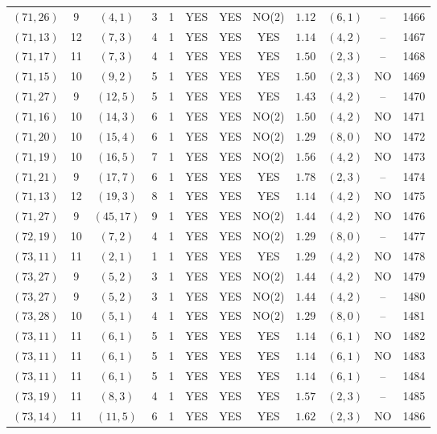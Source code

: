 \begin{longtable}{|c|c|c|c|c|c|c|c|c|c|c|c|}
$(71,26)$ & 9 & $(4,1)$ & 3 & 1 & YES & YES & NO(2) & $1.12$ & $(6,1)$ & -- & 1466\\
$(71,13)$ & 12 & $(7,3)$ & 4 & 1 & YES & YES & YES & $1.14$ & $(4,2)$ & -- & 1467\\
$(71,17)$ & 11 & $(7,3)$ & 4 & 1 & YES & YES & YES & $1.50$ & $(2,3)$ & -- & 1468\\
$(71,15)$ & 10 & $(9,2)$ & 5 & 1 & YES & YES & YES & $1.50$ & $(2,3)$ & NO & 1469\\
$(71,27)$ & 9 & $(12,5)$ & 5 & 1 & YES & YES & YES & $1.43$ & $(4,2)$ & -- & 1470\\
$(71,16)$ & 10 & $(14,3)$ & 6 & 1 & YES & YES & NO(2) & $1.50$ & $(4,2)$ & NO & 1471\\
$(71,20)$ & 10 & $(15,4)$ & 6 & 1 & YES & YES & NO(2) & $1.29$ & $(8,0)$ & NO & 1472\\
$(71,19)$ & 10 & $(16,5)$ & 7 & 1 & YES & YES & NO(2) & $1.56$ & $(4,2)$ & NO & 1473\\
$(71,21)$ & 9 & $(17,7)$ & 6 & 1 & YES & YES & YES & $1.78$ & $(2,3)$ & -- & 1474\\
$(71,13)$ & 12 & $(19,3)$ & 8 & 1 & YES & YES & YES & $1.14$ & $(4,2)$ & NO & 1475\\
$(71,27)$ & 9 & $(45,17)$ & 9 & 1 & YES & YES & NO(2) & $1.44$ & $(4,2)$ & NO & 1476\\
$(72,19)$ & 10 & $(7,2)$ & 4 & 1 & YES & YES & NO(2) & $1.29$ & $(8,0)$ & -- & 1477\\
$(73,11)$ & 11 & $(2,1)$ & 1 & 1 & YES & YES & YES & $1.29$ & $(4,2)$ & NO & 1478\\
$(73,27)$ & 9 & $(5,2)$ & 3 & 1 & YES & YES & NO(2) & $1.44$ & $(4,2)$ & NO & 1479\\
$(73,27)$ & 9 & $(5,2)$ & 3 & 1 & YES & YES & NO(2) & $1.44$ & $(4,2)$ & -- & 1480\\
$(73,28)$ & 10 & $(5,1)$ & 4 & 1 & YES & YES & NO(2) & $1.29$ & $(8,0)$ & -- & 1481\\
$(73,11)$ & 11 & $(6,1)$ & 5 & 1 & YES & YES & YES & $1.14$ & $(6,1)$ & NO & 1482\\
$(73,11)$ & 11 & $(6,1)$ & 5 & 1 & YES & YES & YES & $1.14$ & $(6,1)$ & NO & 1483\\
$(73,11)$ & 11 & $(6,1)$ & 5 & 1 & YES & YES & YES & $1.14$ & $(6,1)$ & -- & 1484\\
$(73,19)$ & 11 & $(8,3)$ & 4 & 1 & YES & YES & YES & $1.57$ & $(2,3)$ & -- & 1485\\
$(73,14)$ & 11 & $(11,5)$ & 6 & 1 & YES & YES & YES & $1.62$ & $(2,3)$ & NO & 1486\\

\end{longtable}
